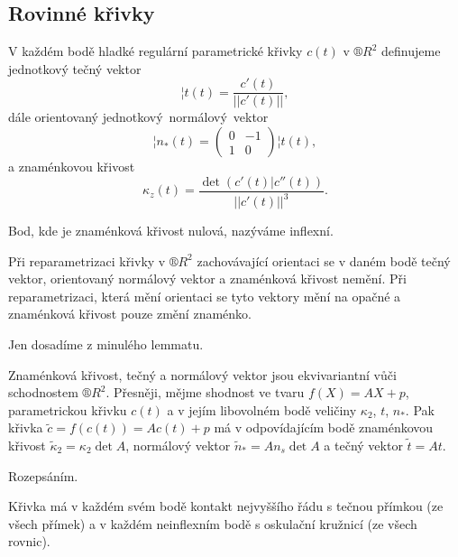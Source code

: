 \documentclass[12pt]{article}					%
\begin{document}
	\subsection{Rovinné křivky}
	\begin{definice}
		V každém bodě hladké regulární parametrické křivky $c(t)$ v $®R^2$ definujeme jednotkový tečný vektor
		$$ ¦t(t) = \frac{c'(t)}{||c'(t)||}, $$
		dále orientovaný jednotkový normálový vektor
		$$ ¦n_*(t) = \begin{pmatrix} 0 & -1 \\ 1 & 0 \end{pmatrix}¦t(t), $$
		a znaménkovou křivost
		$$ \kappa_z(t) = \frac{\det(c'(t)|c''(t))}{||c'(t)||^3}. $$

		Bod, kde je znaménková křivost nulová, nazýváme inflexní.
	\end{definice}

	\begin{veta}
		Při reparametrizaci křivky v $®R^2$ zachovávající orientaci se v daném bodě tečný vektor, orientovaný normálový vektor a znaménková křivost nemění. Při reparametrizaci, která mění orientaci se tyto vektory mění na opačné a znaménková křivost pouze změní znaménko.

		\begin{dukazin}
			Jen dosadíme z minulého lemmatu.
		\end{dukazin}
	\end{veta}

	\begin{veta}
		Znaménková křivost, tečný a normálový vektor jsou ekvivariantní vůči schodnostem $®R^2$. Přesněji, mějme shodnost ve tvaru $f(X) = AX+p$, parametrickou křivku $c(t)$ a v jejím libovolném bodě veličiny $\kappa_2$, $t$, $n_*$. Pak křivka $\tilde c = f(c(t)) = Ac(t) + p$ má v odpovídajícím bodě znaménkovou křivost $\tilde \kappa_2 = \kappa_2\det A$, normálový vektor $\tilde n_* = An_s\det A$ a tečný vektor $\tilde t = At$.

		\begin{dukazin}
			Rozepsáním.
		\end{dukazin}
	\end{veta}

	\begin{veta}
		Křivka má v každém svém bodě kontakt nejvyššího řádu s tečnou přímkou (ze všech přímek) a v každém neinflexním bodě s oskulační kružnicí (ze všech rovnic).
	\end{veta}
\end{document}
